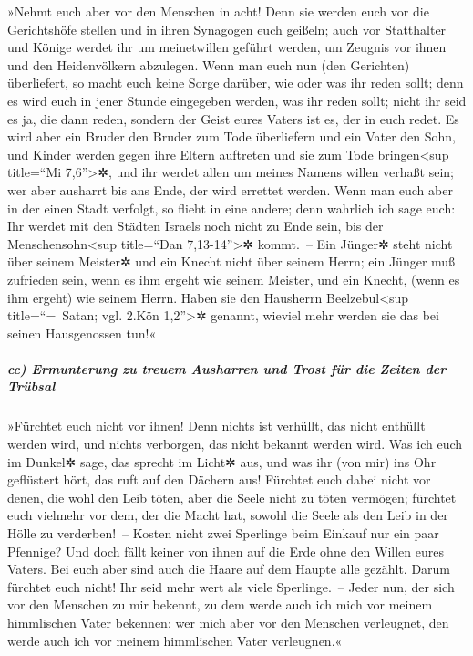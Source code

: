 »Nehmt euch aber vor den Menschen in acht! Denn sie
werden euch vor die Gerichtshöfe stellen und in ihren Synagogen euch
geißeln;  auch vor Statthalter und Könige werdet ihr um
meinetwillen geführt werden, um Zeugnis vor ihnen und den Heidenvölkern
abzulegen.  Wenn man euch nun (den Gerichten)
überliefert, so macht euch keine Sorge darüber, wie oder was ihr reden
sollt; denn es wird euch in jener Stunde eingegeben werden, was ihr
reden sollt;  nicht ihr seid es ja, die dann reden,
sondern der Geist eures Vaters ist es, der in euch redet.
 Es wird aber ein Bruder den Bruder zum Tode überliefern
und ein Vater den Sohn, und Kinder werden gegen ihre Eltern auftreten
und sie zum Tode bringen\textless sup title=``Mi 7,6''\textgreater✲,
 und ihr werdet allen um meines Namens willen verhaßt
sein; wer aber ausharrt bis ans Ende, der wird errettet werden.
 Wenn man euch aber in der einen Stadt verfolgt, so
flieht in eine andere; denn wahrlich ich sage euch: Ihr werdet mit den
Städten Israels noch nicht zu Ende sein, bis der
Menschensohn\textless sup title=``Dan 7,13-14''\textgreater✲ kommt.~--
 Ein Jünger✲ steht nicht über seinem Meister✲ und ein
Knecht nicht über seinem Herrn;  ein Jünger muß zufrieden
sein, wenn es ihm ergeht wie seinem Meister, und ein Knecht, (wenn es
ihm ergeht) wie seinem Herrn. Haben sie den Hausherrn
Beelzebul\textless sup title=``=~Satan; vgl. 2.Kön 1,2''\textgreater✲
genannt, wieviel mehr werden sie das bei seinen Hausgenossen tun!«

\hypertarget{cc-ermunterung-zu-treuem-ausharren-und-trost-fuxfcr-die-zeiten-der-truxfcbsal}{%
\subparagraph{cc) Ermunterung zu treuem Ausharren und Trost für die
Zeiten der
Trübsal}\label{cc-ermunterung-zu-treuem-ausharren-und-trost-fuxfcr-die-zeiten-der-truxfcbsal}}

 »Fürchtet euch nicht vor ihnen! Denn nichts ist
verhüllt, das nicht enthüllt werden wird, und nichts verborgen, das
nicht bekannt werden wird.  Was ich euch im Dunkel✲ sage,
das sprecht im Licht✲ aus, und was ihr (von mir) ins Ohr geflüstert
hört, das ruft auf den Dächern aus!  Fürchtet euch dabei
nicht vor denen, die wohl den Leib töten, aber die Seele nicht zu töten
vermögen; fürchtet euch vielmehr vor dem, der die Macht hat, sowohl die
Seele als den Leib in der Hölle zu verderben!~--  Kosten
nicht zwei Sperlinge beim Einkauf nur ein paar Pfennige? Und doch fällt
keiner von ihnen auf die Erde ohne den Willen eures Vaters.
 Bei euch aber sind auch die Haare auf dem Haupte alle
gezählt.  Darum fürchtet euch nicht! Ihr seid mehr wert
als viele Sperlinge.~--  Jeder nun, der sich vor den
Menschen zu mir bekennt, zu dem werde auch ich mich vor meinem
himmlischen Vater bekennen;  wer mich aber vor den
Menschen verleugnet, den werde auch ich vor meinem himmlischen Vater
verleugnen.«

